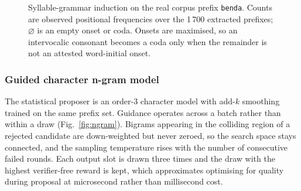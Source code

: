 \documentclass[conference]{IEEEtran}
\newcommand{\code}[1]{\texttt{\footnotesize #1}}
\begin{document}
\begin{figure}[t]
\caption{Syllable-grammar induction on the real corpus prefix \code{benda}.
Counts are observed positional frequencies over the 1\,700 extracted prefixes;
$\varnothing$ is an empty onset or coda. Onsets are maximised, so an
intervocalic consonant becomes a coda only when the remainder is not an attested
word-initial onset.}
\label{fig:grammar}
\end{figure}

\subsubsection{Guided character n-gram model}
The statistical proposer is an order-3 character model with add-$k$ smoothing
trained on the same prefix set. Guidance operates across a batch rather than
within a draw (Fig.~\ref{fig:ngram}). Bigrams appearing in the colliding region
of a rejected candidate are down-weighted but never zeroed, so the search space
stays connected, and the sampling temperature rises with the number of
consecutive failed rounds. Each output slot is drawn three times and the draw
with the highest verifier-free reward is kept, which approximates optimising for
quality during proposal at microsecond rather than millisecond cost.
\end{document}
